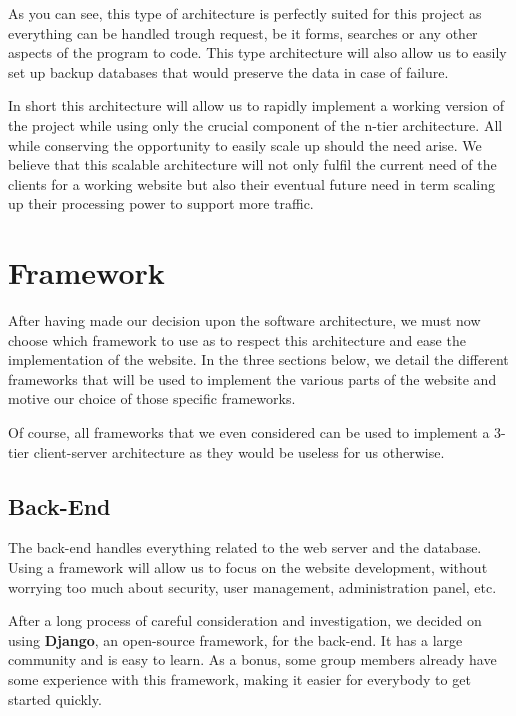 As you can see, this type of architecture is perfectly suited for this project as everything can be handled trough request, be it forms, searches or any other aspects of the program to code. This type architecture will also allow us to easily set up backup databases that would preserve the data in case of failure. \newline

In short this architecture will allow us to rapidly implement a working version of the project while using only the crucial component of the n-tier architecture. All while conserving the opportunity to easily scale up should the need arise. We believe that this scalable architecture will not only fulfil the current need of the clients for a working website but also their eventual future need in term scaling up their processing power to support more traffic.

\section{Framework}

After having made our decision upon the software architecture, we must now choose which framework to use as to respect this architecture and ease the implementation of the website. In the three sections below, we detail the different frameworks that will be used to implement the various parts of the website and motive our choice of those specific frameworks. \newline

Of course, all frameworks that we even considered can be used to implement a 3-tier client-server architecture as they would be useless for us otherwise.

\subsection{Back-End}

The back-end handles everything related to the web server and the database. Using a framework will allow us to focus on the website development, without worrying too much about security, user management, administration panel, etc.\newline

After a long process of careful consideration and investigation, we decided on using \textbf{Django}, an open-source framework, for the back-end. It has a large community and is easy to learn. As a bonus, some group members already have some experience with this framework, making it easier for everybody to get started quickly.\newline

